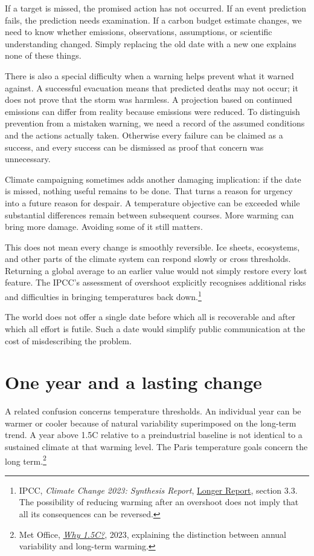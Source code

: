 \documentclass[12pt,a4paper]{book}
\begin{document}
If a target is missed, the promised action has not occurred. If an event prediction fails, the prediction needs examination. If a carbon budget estimate changes, we need to know whether emissions, observations, assumptions, or scientific understanding changed. Simply replacing the old date with a new one explains none of these things.

There is also a special difficulty when a warning helps prevent what it warned against. A successful evacuation means that predicted deaths may not occur; it does not prove that the storm was harmless. A projection based on continued emissions can differ from reality because emissions were reduced. To distinguish prevention from a mistaken warning, we need a record of the assumed conditions and the actions actually taken. Otherwise every failure can be claimed as a success, and every success can be dismissed as proof that concern was unnecessary.

Climate campaigning sometimes adds another damaging implication: if the date is missed, nothing useful remains to be done. That turns a reason for urgency into a future reason for despair. A temperature objective can be exceeded while substantial differences remain between subsequent courses. More warming can bring more damage. Avoiding some of it still matters.

This does not mean every change is smoothly reversible. Ice sheets, ecosystems, and other parts of the climate system can respond slowly or cross thresholds. Returning a global average to an earlier value would not simply restore every lost feature. The IPCC's assessment of overshoot explicitly recognises additional risks and difficulties in bringing temperatures back down.\footnote{IPCC, \emph{Climate Change 2023: Synthesis Report}, \href{https://www.ipcc.ch/site/assets/uploads/2023/03/Doc5_Adopted_AR6_SYR_Longer_Report.pdf}{Longer Report}, section 3.3. The possibility of reducing warming after an overshoot does not imply that all its consequences can be reversed.}

The world does not offer a single date before which all is recoverable and after which all effort is futile. Such a date would simplify public communication at the cost of misdescribing the problem.

\section*{One year and a lasting change}

A related confusion concerns temperature thresholds. An individual year can be warmer or cooler because of natural variability superimposed on the long-term trend. A year above 1.5\textdegree{}C relative to a preindustrial baseline is not identical to a sustained climate at that warming level. The Paris temperature goals concern the long term.\footnote{Met Office, \href{https://www.metoffice.gov.uk/blog/2023/why-1-5c}{\emph{Why 1.5\textdegree{}C?}}, 2023, explaining the distinction between annual variability and long-term warming.}
\end{document}

